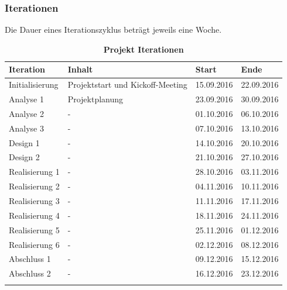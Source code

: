 \documentclass[a4,12pt]{scrartcl}
\begin{document}
\subsubsection{Iterationen}
Die Dauer eines Iterationszyklus beträgt jeweils eine Woche. 
\begin{table}[htb]
\centering
    \begin{tabular}{@{} p{3cm} l l l@{}}\toprule    
    {Iteration} & {Inhalt} & {Start} & {Ende}\\ \midrule
    Initialisierung & Projektstart und Kickoff-Meeting & 15.09.2016  & 22.09.2016\\ \addlinespace
    Analyse 1 & Projektplanung  & 23.09.2016 & 30.09.2016\\ \addlinespace
    Analyse 2 & -  & 01.10.2016 & 06.10.2016\\ \addlinespace
    Analyse 3 & -  & 07.10.2016 & 13.10.2016\\ \addlinespace
    Design 1 & - & 14.10.2016 & 20.10.2016\\ \addlinespace
    Design 2 & - & 21.10.2016 & 27.10.2016\\ \addlinespace
    Realisierung 1 & - & 28.10.2016  & 03.11.2016\\ \addlinespace
    Realisierung 2 & - & 04.11.2016  & 10.11.2016\\ \addlinespace
    Realisierung 3 & - & 11.11.2016  & 17.11.2016\\ \addlinespace
    Realisierung 4 & - & 18.11.2016  & 24.11.2016\\ \addlinespace
    Realisierung 5 & - & 25.11.2016  & 01.12.2016\\ \addlinespace
    Realisierung 6 & - & 02.12.2016  & 08.12.2016\\ \addlinespace
    Abschluss 1 & - &  09.12.2016 & 15.12.2016\\ \addlinespace
    Abschluss 2 & - &  16.12.2016 & 23.12.2016\\ \addlinespace
    \bottomrule
    \end{tabular}
\caption{\textbf{Projekt Iterationen}}
\end{table}
\end{document}
